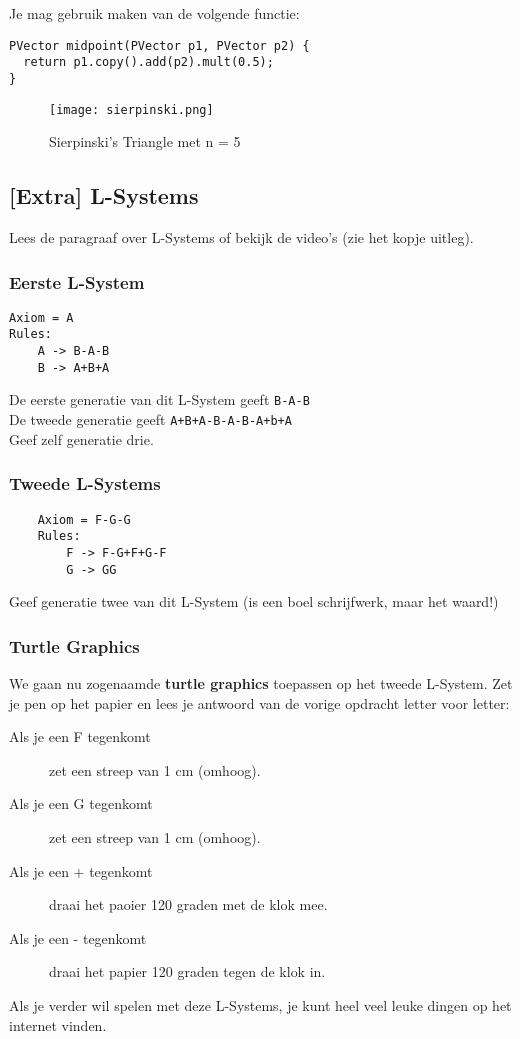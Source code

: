 \documentclass[../syllabus.tex]{subfiles}
\begin{document}
Je mag gebruik maken van de volgende functie:
\begin{lstlisting}
PVector midpoint(PVector p1, PVector p2) {
  return p1.copy().add(p2).mult(0.5);
}
\end{lstlisting}

\begin{figure}[H]
	\centering
	\texttt{[image: sierpinski.png]}
	\caption{Sierpinski's Triangle met n = 5}
	\label{fig:sierpinski}
\end{figure}

\newpage
\subsection{[Extra] L-Systems}
Lees de paragraaf over L-Systems of bekijk de video's (zie het kopje uitleg). 
\subsubsection{Eerste L-System}
\begin{verbatim}
Axiom = A
Rules:
    A -> B-A-B
    B -> A+B+A
\end{verbatim}
De eerste generatie van dit L-System geeft \texttt{B-A-B}\\
De tweede generatie geeft \texttt{A+B+A-B-A-B-A+b+A}\\
Geef zelf generatie drie.

\subsubsection{Tweede L-Systems}
\begin{verbatim}
    Axiom = F-G-G
    Rules:
        F -> F-G+F+G-F
        G -> GG
\end{verbatim}
Geef generatie twee van dit L-System (is een boel schrijfwerk, maar het waard!)

\subsubsection{Turtle Graphics}
We gaan nu zogenaamde \textbf{turtle graphics} toepassen op het tweede L-System. Zet je pen op het papier en lees je antwoord van de vorige opdracht letter voor letter:
\begin{description}
    \item[Als je een F tegenkomt] zet een streep van 1 cm (omhoog).
    \item[Als je een G tegenkomt] zet een streep van 1 cm (omhoog).
    \item[Als je een + tegenkomt] draai het paoier 120 graden met de klok mee.
    \item[Als je een - tegenkomt] draai het papier 120 graden tegen de klok in.
\end{description}
Als je verder wil spelen met deze L-Systems, je kunt heel veel leuke dingen op het internet vinden. 
\end{document}
